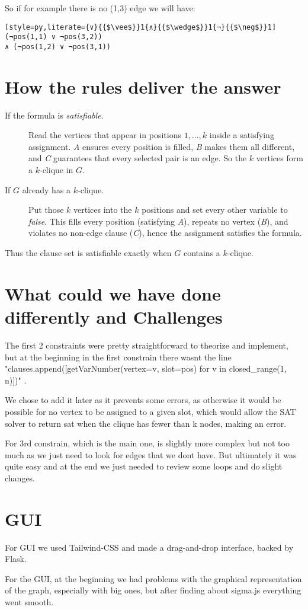 \documentclass[11pt]{article}
\begin{document}
So if for example there is no (1,3) edge we will have:

 \begin{lstlisting}[style=py,literate={∨}{{$\vee$}}1{∧}{{$\wedge$}}1{¬}{{$\neg$}}1]
(¬pos(1,1) ∨ ¬pos(3,2))
∧ (¬pos(1,2) ∨ ¬pos(3,1))
 \end{lstlisting}


\section*{How the rules deliver the answer}
\begin{description}
  \item[If the formula is \emph{satisfiable}.]  
        Read the vertices that appear in positions $1,\dots,k$ inside a satisfying assignment.  
        \emph{A} ensures every position is filled, \emph{B} makes them all different, and \emph{C} guarantees that every selected pair is an edge.  
        So the $k$ vertices form a $k$-clique in $G$.
  \item[If $G$ already has a $k$-clique.]  
        Put those $k$ vertices into the $k$ positions and set every other variable to \textit{false}.  
        This fills every position (satisfying \emph{A}), repeats no vertex (\emph{B}), and violates no non-edge clause (\emph{C}), hence the assignment satisfies the formula.
\end{description}

Thus the clause set is satisfiable exactly when $G$ contains a $k$-clique.

\section*{What could we have done differently and Challenges}

The first 2 constraints were pretty straightforward to theorize and implement, but at the beginning in the first constrain there wasnt the line  "clauses.append([getVarNumber(vertex=v, slot=pos)
for v in closed\_range(1, n)])" .

We chose to add it later as it prevents some errors, as otherwise it would be possible for no vertex to be assigned to a given slot, which would allow the SAT solver to return sat when the clique has fewer than k nodes, making an error.

For 3rd constrain, which is the main one, is slightly more complex but not too much as we just need to look for edges that we dont have. But ultimately it was quite easy and at the end we just needed to review some loops and do slight changes.





\section*{GUI}

For GUI we used Tailwind-CSS and made a drag-and-drop interface, backed by Flask.

For the GUI, at the beginning we had problems with the graphical representation of the graph, especially with big ones, but after finding about sigma.js everything went smooth.
\end{document}
